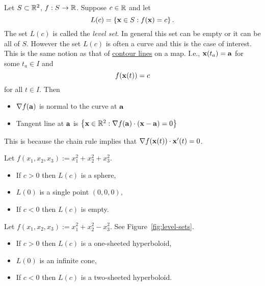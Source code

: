 Let \(S\subset \bR^2\), \(f:S\to\bR\).
Suppose \(c\in \bR\) and let
\[
    L(c) = \left\{\xx\in S : f(\xx)=c\right\}.
\]
The set \(L(c)\) is called the \emph{level set}.
In general this set can be empty or it can be all of \(S\).
However the set \(L(c)\) is often a curve and this is the case of interest.
This is the same notion as that of \href{https://en.wikipedia.org/wiki/Contour_line}{contour lines} on a map.
I.e., \(\xx(t_a) = \aa\) for some \(t_a \in I\) and \[f(\xx(t))=c\] for all \(t\in I\).
Then
\begin{itemize}
    \item \(\nabla f(\aa)\) is normal to the curve at \(\aa\)
    \item Tangent line at \(\aa\) is
          \(\left\{\xx\in\bR^2: \nabla f(\aa) \cdot (\xx-\aa)=0\right\}\)
\end{itemize}

This is because the chain rule implies that \(\nabla f(\xx(t)) \cdot \xx'(t) = 0\).
\begin{example*}
    Let \(f(x_1,x_2,x_3):=x_1^2 + x_2^2 + x_3^2\).
    \begin{itemize}
        \item If \(c>0\) then \(L(c)\) %
              is a sphere,
        \item \(L(0) \) is a single point \((0,0,0)\),
        \item If \(c<0\) then \(L(c)\) is empty.
    \end{itemize}
\end{example*}

\begin{example*}
    Let \(f(x_1,x_2,x_3):=x_1^2 + x_2^2 - x_3^2\).
    See Figure~\ref{fig:level-sets}.
    \begin{itemize}
        \item If \(c>0\) then \(L(c)\) is a one-sheeted hyperboloid,
        \item \(L(0) \) is an infinite cone,
        \item If \(c<0\) then \(L(c)\) is a two-sheeted hyperboloid.
    \end{itemize}
\end{example*}

